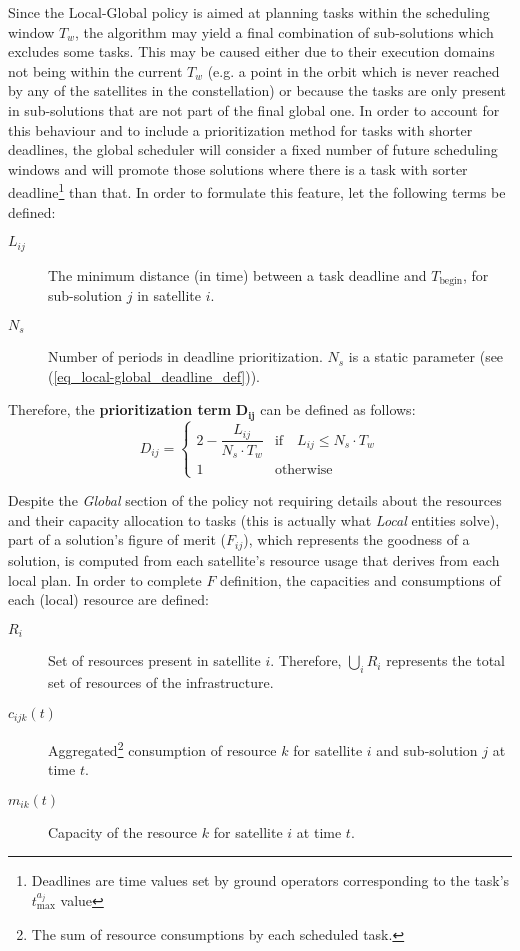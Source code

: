 Since the Local-Global policy is aimed at planning tasks within the scheduling window $T_w$, the algorithm may yield a final combination of sub-solutions which excludes some tasks. This may be caused either due to their execution domains not being within the current $T_w$ (e.g. a point in the orbit which is never reached by any of the satellites in the constellation) or because the tasks are only present in sub-solutions that are not part of the final global one. In order to account for this behaviour and to include a prioritization method for tasks with shorter deadlines, the global scheduler will consider a fixed number of future scheduling windows and will promote those solutions where there is a task with sorter deadline\footnote{Deadlines are time values set by ground operators corresponding to the task's $t_{\text{max}}^{a_j}$ value} than that. In order to formulate this feature, let the following terms be defined:
\begin{description}%
\item[$L_{ij}$] The minimum distance (in time) between a task deadline and $T_\text{begin}$, for sub-solution $j$ in satellite $i$. 
\item[$N_s$] Number of periods in deadline prioritization. $N_s$ is a static parameter (see (\ref{eq_local-global_deadline_def})). 
\end{description}

Therefore, the \textbf{prioritization term} $\mathbf{D_{ij}}$ can be defined as follows:
\begin{equation}
\label{eq_local-global_deadline_def}
D_{ij} = 
\begin{cases}
2-\dfrac{L_{ij}}{N_s \cdot T_w} & \text{if} \quad L_{ij} \leq N_s \cdot T_w\\
1 & \text{otherwise}
\end{cases}
\end{equation}

Despite the \emph{Global} section of the policy not requiring details about the resources and their capacity allocation to tasks (this is actually what \emph{Local} entities solve), part of a solution's figure of merit ($F_{ij}$), which represents the goodness of a solution, is computed from each satellite's resource usage that derives from each local plan. In order to complete $F$ definition, the capacities and consumptions of each (local) resource are defined:

\begin{description}
\item[$R_i$] Set of resources present in satellite $i$. Therefore, $\bigcup_i{R_i}$ represents the total set of resources of the infrastructure.
\item[$c_{ijk}(t)$] Aggregated\footnote{The sum of resource consumptions by each scheduled task.} consumption of resource $k$ for satellite $i$ and sub-solution $j$ at time $t$.
\item[$m_{ik}(t)$] Capacity of the resource $k$ for satellite $i$ at time $t$.
\end{description}

